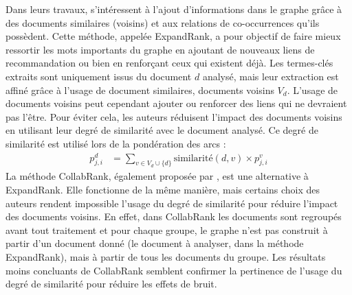           Dans leurs travaux, \citet{wan2008expandrank} s'intéressent à l'ajout
          d'informations dans le graphe grâce à des documents similaires (voisins)
          et aux relations de co-occurrences qu'ils possèdent. Cette méthode,
          appelée ExpandRank, a pour objectif de faire mieux ressortir les mots
          importants du graphe en ajoutant de nouveaux liens de recommandation ou
          bien en renforçant ceux qui existent déjà. Les termes-clés extraits sont
          uniquement issus du document $d$ analysé, mais leur extraction est affiné
          grâce à l'usage de document similaires, documents voisins $V_d$.
          L'usage de documents voisins peut cependant ajouter ou renforcer des liens
          qui ne devraient pas l'être. Pour éviter cela, les auteurs réduisent
          l'impact des documents voisins en utilisant leur degré de similarité avec
          le document analysé. Ce degré de similarité est utilisé lors de la
          pondération des arcs :
          \begin{align}
            p_{j, i}^d &= \sum_{v \in V_d \cup \{d\}} \text{similarité}(d, v) \times p_{j, i}^v
          \end{align}
          La méthode CollabRank, également proposée par \citet{wan2008collabrank},
          est une alternative à ExpandRank. Elle fonctionne de la même manière, mais
          certains choix des auteurs rendent impossible l'usage du degré de
          similarité pour réduire l'impact des documents voisins. En effet, dans
          CollabRank les documents sont regroupés avant tout traitement et pour
          chaque groupe, le graphe n'est pas construit à partir d'un document donné
          (le document à analyser, dans la méthode ExpandRank), mais à partir de
          tous les documents du groupe. Les résultats moins concluants de CollabRank
          semblent confirmer la pertinence de l'usage du degré de similarité pour
          réduire les effets de bruit.


